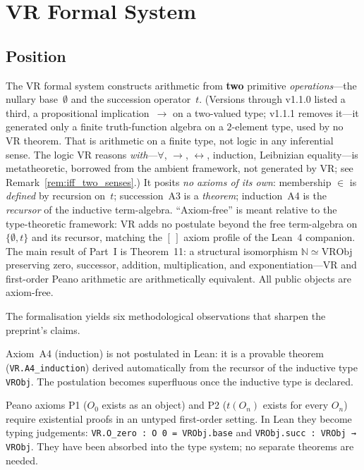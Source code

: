 \chapter{VR Formal System}
\label{chap:vr}

\section{Position}

The VR formal system constructs arithmetic from \textbf{two} primitive
\emph{operations}---the nullary base~$\emptyset$ and the succession
operator~$t$.  (Versions through v1.1.0 listed a third, a propositional
implication~$\to$ on a two-valued type; v1.1.1 removes it---it generated
only a finite truth-function algebra on a $2$-element type, used by no VR
theorem.  That is arithmetic on a finite type, not logic in any
inferential sense.  The logic VR reasons \emph{with}---$\forall$, $\to$,
$\leftrightarrow$, induction, Leibnizian equality---is metatheoretic,
borrowed from the ambient framework, not generated by VR; see
Remark~\ref{rem:iff_two_senses}.)  It posits \emph{no axioms of its own}:
membership $\in$ is \emph{defined} by recursion on~$t$; succession~A3 is a
\emph{theorem}; induction~A4 is the \emph{recursor} of the inductive
term-algebra.  ``Axiom-free'' is meant relative to the type-theoretic
framework: VR adds no postulate beyond the free term-algebra on
$\{\emptyset, t\}$ and its recursor, matching the $[\,]$ axiom profile of
the Lean~4 companion.  The main result of Part~I is Theorem~11: a
structural isomorphism $\mathbb{N} \simeq \mathrm{VRObj}$ preserving zero,
successor, addition, multiplication, and exponentiation---VR and
first-order Peano arithmetic are arithmetically equivalent.  All public
objects are axiom-free.

The formalisation yields six methodological observations that sharpen
the preprint's claims.

\begin{remark}[A4 as theorem]
\label{rem:A4_theorem}
\leanok
Axiom~A4 (induction) is not postulated in Lean: it is a provable theorem
(\texttt{VR.A4\_induction}) derived automatically from the recursor of the
inductive type \texttt{VRObj}.  The postulation becomes superfluous once
the inductive type is declared.
\end{remark}

\begin{remark}
\label{rem:P1P2}
\leanok
Peano axioms P1 ($O_0$ exists as an object) and P2 ($t(O_n)$ exists for
every $O_n$) require existential proofs in an untyped first-order
setting.  In Lean they become typing judgements: \texttt{VR.O\_zero :
O~0 = VRObj.base} and \texttt{VRObj.succ : VRObj → VRObj}.  They have
been absorbed into the type system; no separate theorems are needed.
\end{remark}

